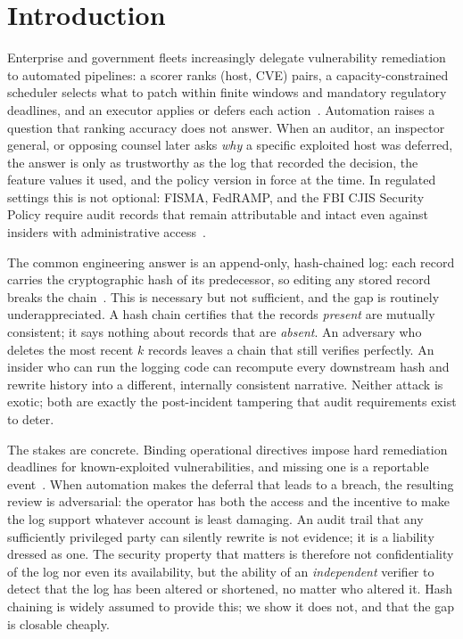 \documentclass[journal]{IEEEtran}
\begin{document}
\section{Introduction}
\label{sec:intro}
Enterprise and government fleets increasingly delegate vulnerability
remediation to automated pipelines: a scorer ranks (host, CVE) pairs, a
capacity-constrained scheduler selects what to patch within finite windows
and mandatory regulatory deadlines, and an executor applies or defers each
action~\cite{cisa2021bod2201,nist2022sp80040r4}. Automation raises a
question that ranking accuracy does not answer. When an auditor, an
inspector general, or opposing counsel later asks \emph{why} a specific
exploited host was deferred, the answer is only as trustworthy as the log
that recorded the decision, the feature values it used, and the policy
version in force at the time. In regulated settings this is not optional:
FISMA, FedRAMP, and the FBI CJIS Security Policy require audit records that
remain attributable and intact even against insiders with administrative
access~\cite{nist2022sp80053,cjis2023}.

The common engineering answer is an append-only, hash-chained log: each
record carries the cryptographic hash of its predecessor, so editing any
stored record breaks the chain~\cite{haber1991timestamp,schneier1999secure}.
This is necessary but not sufficient, and the gap is routinely
underappreciated. A hash chain certifies that the records \emph{present}
are mutually consistent; it says nothing about records that are
\emph{absent}. An adversary who deletes the most recent $k$ records leaves a
chain that still verifies perfectly. An insider who can run the logging code
can recompute every downstream hash and rewrite history into a different,
internally consistent narrative. Neither attack is exotic; both are exactly
the post-incident tampering that audit requirements exist to deter.

The stakes are concrete. Binding operational directives impose hard
remediation deadlines for known-exploited vulnerabilities, and missing one is
a reportable event~\cite{cisa2021bod2201}. When automation makes the deferral
that leads to a breach, the resulting review is adversarial: the operator has
both the access and the incentive to make the log support whatever account is
least damaging. An audit trail that any sufficiently privileged party can
silently rewrite is not evidence; it is a liability dressed as one. The
security property that matters is therefore not confidentiality of the log nor
even its availability, but the ability of an \emph{independent} verifier to
detect that the log has been altered or shortened, no matter who altered it.
Hash chaining is widely assumed to provide this; we show it does not, and that
the gap is closable cheaply.
\end{document}
